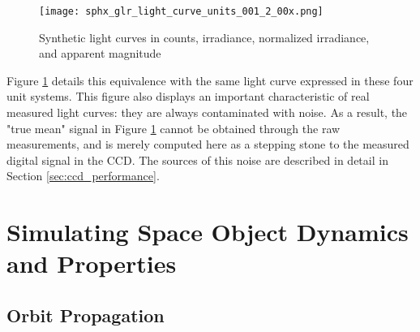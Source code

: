 \begin{figure}[!htb]
  \centering
  \texttt{[image: sphx\_glr\_light\_curve\_units\_001\_2\_00x.png]}
  \caption{Synthetic light curves in counts, irradiance, normalized irradiance, and apparent magnitude}
  \label{fig:light_curve_units}
\end{figure}

Figure \ref{fig:light_curve_units} details this equivalence with the same light curve expressed in these four unit systems. This figure also displays an important characteristic of real measured light curves: they are always contaminated with noise. As a result, the "true mean" signal in Figure \ref{fig:light_curve_units} cannot be obtained through the raw measurements, and is merely computed here as a stepping stone to the measured digital signal in the CCD. The sources of this noise are described in detail in Section \ref{sec:ccd_performance}.

\section{Simulating Space Object Dynamics and Properties}

\subsection{Orbit Propagation}


